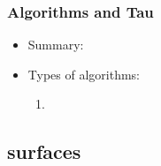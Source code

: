  	\subsubsection{Algorithms and Tau}
 	\begin{itemize}
 		\item Summary: %
 		\item Types of algorithms:
 		\begin{enumerate}
 			\item %
 		\end{enumerate}
 	\end{itemize}	

 \subsection{surfaces}









